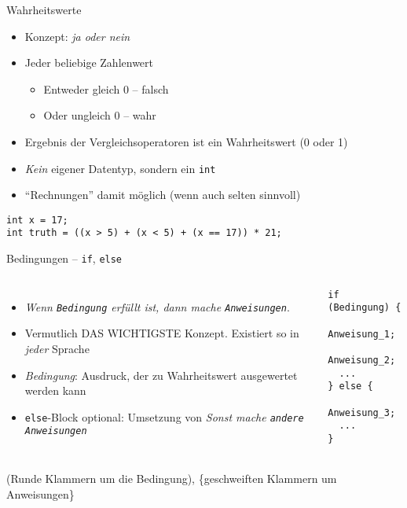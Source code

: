 
\begin{frame}[fragile]{Wahrheitswerte}
%
\begin{itemize}
\item Konzept: \emph{ja oder nein}
\item Jeder beliebige Zahlenwert
	\begin{itemize}
	\item Entweder gleich 0 -- falsch
	\item Oder ungleich 0 -- wahr
	\end{itemize}
\item Ergebnis der Vergleichsoperatoren ist ein Wahrheitswert (0 oder 1)
\item \emph{Kein} eigener Datentyp, sondern ein \texttt{int}
\item \enquote{Rechnungen} damit möglich (wenn auch selten sinnvoll)
\end{itemize}
%
\begin{codebox}[Beispiel]
\begin{verbatim}
int x = 17;
int truth = ((x > 5) + (x < 5) + (x == 17)) * 21;
\end{verbatim}
\end{codebox}
%
\end{frame}


\begin{frame}[fragile]{Bedingungen -- \texttt{if}, \texttt{else}}
%
\begin{columns}[T]
\begin{itemize}
\item \emph{Wenn \texttt{Bedingung} erfüllt ist, dann mache \texttt{Anweisungen}}.
\item Vermutlich DAS WICHTIGSTE Konzept. Existiert so in \emph{jeder} Sprache
\item \emph{Bedingung}: Ausdruck, der zu Wahrheitswert ausgewertet werden kann
\item \texttt{else}-Block optional: Umsetzung von \emph{Sonst mache \texttt{andere Anweisungen}}
\end{itemize}
%
\begin{codebox}[Syntax]
\begin{verbatim}
if (Bedingung) {
  Anweisung_1;
  Anweisung_2;
  ...
} else {
  Anweisung_3;
  ...
}
\end{verbatim}
\end{codebox}
\end{columns}
%
\begin{warnbox}
\small (Runde Klammern um die Bedingung), \{geschweiften Klammern um Anweisungen\}
\end{warnbox}
%
\end{frame}

